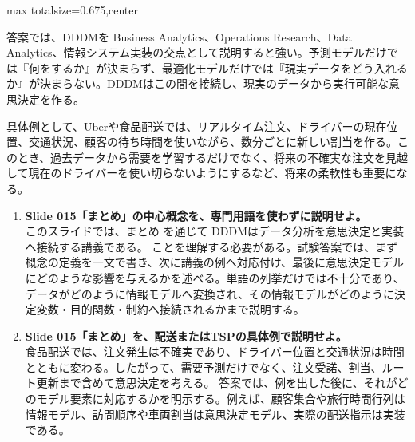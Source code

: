 \begin{adjustbox}{max totalsize={\textwidth}{0.675\textheight},center}
\begin{minipage}{\textwidth}
\begin{minipage}[t]{0.485\textwidth}
答案では、DDDMを Business Analytics、Operations Research、Data Analytics、情報システム実装の交点として説明すると強い。予測モデルだけでは『何をするか』が決まらず、最適化モデルだけでは『現実データをどう入れるか』が決まらない。DDDMはこの間を接続し、現実のデータから実行可能な意思決定を作る。\par
具体例として、Uberや食品配送では、リアルタイム注文、ドライバーの現在位置、交通状況、顧客の待ち時間を使いながら、数分ごとに新しい割当を作る。このとき、過去データから需要を学習するだけでなく、将来の不確実な注文を見越して現在のドライバーを使い切らないようにするなど、将来の柔軟性も重要になる。\par
{}
\begin{enumerate}
\item \textbf{Slide 015「まとめ」の中心概念を、専門用語を使わずに説明せよ。}\\このスライドでは、まとめ を通じて DDDMはデータ分析を意思決定と実装へ接続する講義である。 ことを理解する必要がある。試験答案では、まず概念の定義を一文で書き、次に講義の例へ対応付け、最後に意思決定モデルにどのような影響を与えるかを述べる。単語の列挙だけでは不十分であり、データがどのように情報モデルへ変換され、その情報モデルがどのように決定変数・目的関数・制約へ接続されるかまで説明する。
\item \textbf{Slide 015「まとめ」を、配送またはTSPの具体例で説明せよ。}\\食品配送では、注文発生は不確実であり、ドライバー位置と交通状況は時間とともに変わる。したがって、需要予測だけでなく、注文受諾、割当、ルート更新まで含めて意思決定を考える。 答案では、例を出した後に、それがどのモデル要素に対応するかを明示する。例えば、顧客集合や旅行時間行列は情報モデル、訪問順序や車両割当は意思決定モデル、実際の配送指示は実装である。
\end{enumerate}
\end{minipage}
\end{minipage}
\end{adjustbox}

